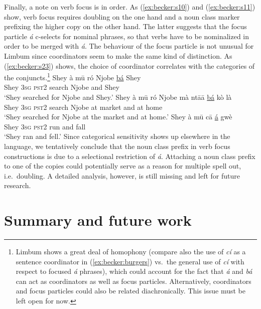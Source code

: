 \documentclass[output=paper,
modfonts
]{langscibook}
\begin{document}
Finally, a note on verb focus is in order. As (\ref{ex:becker:s10}) and (\ref{ex:becker:s11}) show, verb focus requires doubling on the one hand and a noun class marker prefixing the higher copy on the other hand. The latter suggests that the focus particle {\em \'a} c-selects for nominal phrases, so that verbs have to be nominalized in order to be merged with {\em \'a}. The behaviour of the focus particle is not unusual for Limbum since coordinators seem to make the same kind of distinction. As (\ref{ex:becker:s23}) shows, the choice of coordinator correlates with the categories of the conjuncts.\footnote{Limbum shows a great deal of homophony (compare also the use of {\em c\'i} as a sentence coordinator in (\ref{ex:becker:burgers}) vs.\ the general use of {\em c\'i} with respect to focused {\em \'a} phrases), which could account for the fact that {\em \'a} and {\em b\'a} can act as coordinators as well as focus particles. Alternatively, coordinators and focus particles could also be related diachronically. This issue must be left open for now.}
\ea \label{ex:becker:s23}
\ea
\gll Shey \`a m\=u r\'o Njobe \underline{b\'a} Shey \\ 
Shey \textsc{3sg} \textsc{pst2} search Njobe and Shey \\ 
\glt `Shey searched for Njobe and Shey.'
\ex
\gll Shey \`a m\=u r\'o Njobe m\`a nt\=a\=a \underline{b\'a} k\`o l\`a\textglotstop \\ 
Shey \textsc{3sg} \textsc{pst2} search Njobe at market and at home \\ 
\glt `Shey searched for Njobe at the market and at home.'
\ex
\gll Shey \`a m\=u c\=a \underline{\'a} gw\`e \\ 
Shey \textsc{3sg} \textsc{pst2} run and fall \\ 
\glt `Shey ran and fell.'
\z \z 
Since categorical sensitivity shows up elsewhere in the language, we tentatively conclude that the noun class prefix in verb focus constructions is due to a selectional restriction of {\em \'a}. Attaching a noun class prefix to one of the copies could potentially serve as a reason for multiple spell out, i.e.\ doubling. A detailed analysis, however, is still missing and left for future research.

\section{Summary and future work}
\end{document}
